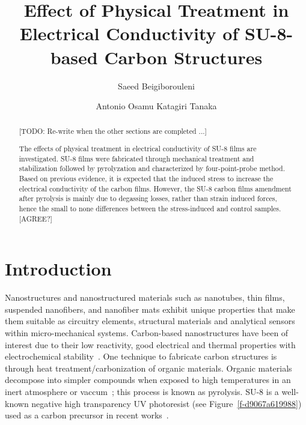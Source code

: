 \documentclass[3p,,preprint,12pt]{elsarticle}
\begin{document}
\begin{frontmatter}
	
\title{Effect of Physical Treatment in Electrical Conductivity of SU-8-based Carbon Structures
}
    
\author[a4afda52a866c]{Saeed Beigiborouleni}
\author[a4afda52a866c]{Antonio Osamu Katagiri Tanaka}
    
\address[a4afda52a866c]{
    ITESM MTY\unskip, Av. Eugenio Garza Sada Sur\unskip, Monterrey\unskip, 2501\unskip, N.L.\unskip, Mexico}
  

\begin{abstract}
[TODO: Re-write when the other sections are completed ...]

The effects of physical treatment in electrical conductivity of SU-8 films are investigated. SU-8 films were fabricated through mechanical treatment and stabilization followed by pyrolyzation and characterized by four-point-probe method. Based on previous evidence, it is expected that the induced stress to increase the electrical conductivity of the carbon films. However, the SU-8 carbon films amendment after pyrolysis is mainly due to degassing losses, rather than strain induced forces, hence the small to none differences between the stress-induced and control samples. [AGREE?]
\end{abstract}
\end{frontmatter}
    
\section{Introduction}
Nanostructures and nanostructured materials such as nanotubes, thin films, suspended nanofibers, and nanofiber mats exhibit unique properties that make them suitable as circuitry elements, structural materials and analytical sensors within micro-mechanical systems. Carbon-based nanostructures have been of interest due to their low reactivity, good electrical and thermal properties with electrochemical stability\unskip~\cite{708527:16798890}. One technique to fabricate carbon structures is through heat treatment/carbonization of organic materials. Organic materials decompose into simpler compounds when exposed to high temperatures in an inert atmosphere or vaccum\unskip~\cite{708527:16798894}; this process is known as pyrolysis. SU-8 is a well-known negative high transparency UV photoresist (see Figure~\ref{f-d9067a619988}) used as a carbon precursor in recent works\unskip~\cite{708527:16798894,708527:16798991,708527:16798990}. 
\end{document}
